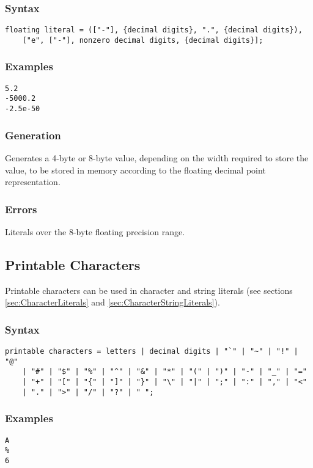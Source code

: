 \documentclass[10pt,a4paper]{article}
\begin{document}
\subsubsection{Syntax}
\begin{verbatim}
floating literal = (["-"], {decimal digits}, ".", {decimal digits}), 
    ["e", ["-"], nonzero decimal digits, {decimal digits}];
\end{verbatim}

\subsubsection{Examples}
\begin{verbatim}
5.2
-5000.2
-2.5e-50
\end{verbatim}

\subsubsection{Generation}
Generates a 4-byte or 8-byte value, depending on the width required to store the value, to be stored in memory according to the floating decimal point representation.

\subsubsection{Errors}
Literals over the 8-byte floating precision range.

\newpage




\subsection{Printable Characters}
Printable characters can be used in character and string literals (see sections \ref{sec:CharacterLiterals} and \ref{sec:CharacterStringLiterals}).

\subsubsection{Syntax}
\begin{verbatim}
printable characters = letters | decimal digits | "`" | "~" | "!" | "@"
    | "#" | "$" | "%" | "^" | "&" | "*" | "(" | ")" | "-" | "_" | "="
    | "+" | "[" | "{" | "]" | "}" | "\" | "|" | ";" | ":" | "," | "<"
    | "." | ">" | "/" | "?" | " ";
\end{verbatim}

\subsubsection{Examples}
\begin{verbatim}
A
%
6
\end{verbatim}
\end{document}
